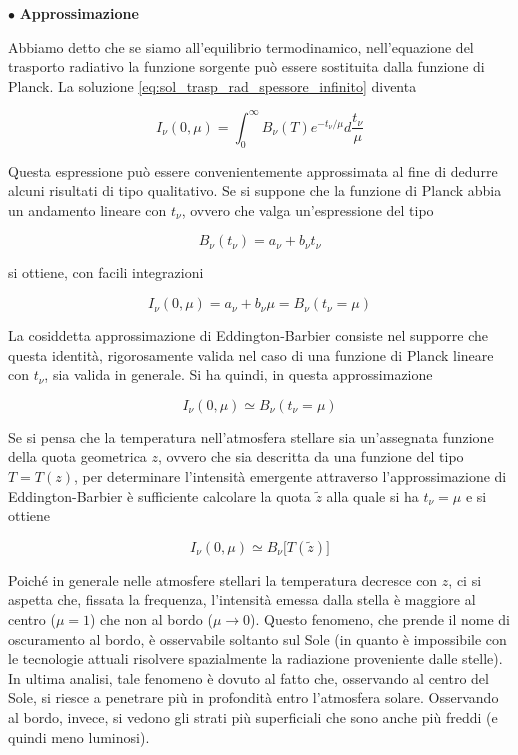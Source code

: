$\bullet$ \textbf{Approssimazione}

\vspace{0.2cm}Abbiamo detto che se siamo all'equilibrio termodinamico, nell'equazione del trasporto radiativo la funzione sorgente può essere sostituita dalla funzione di Planck. La soluzione \eqref{eq:sol_trasp_rad_spessore_infinito} diventa

\begin{equation}
    I_{\nu}(0,\mu)= \int_{0}^{\infty} B_{\nu}(T) e^{-t_{\nu}/\mu} d\frac{t_{\nu}}{\mu}
\end{equation}

Questa espressione può essere convenientemente approssimata al fine di dedurre alcuni risultati di tipo qualitativo. Se si suppone che la funzione di Planck abbia un andamento lineare con $t_{\nu}$, ovvero che valga un'espressione del tipo

$$B_{\nu}(t_{\nu})=a_{\nu} + b_{\nu}t_{\nu}$$

si ottiene, con facili integrazioni

$$I_{\nu}(0,\mu)=a_{\nu} + b_{\nu}\mu=B_{\nu}(t_{\nu}=\mu)$$

La cosiddetta approssimazione di Eddington-Barbier consiste nel supporre che questa identità, rigorosamente valida nel caso di una funzione di Planck lineare con $t_{\nu}$, sia valida in generale. Si ha quindi, in questa approssimazione

$$I_{\nu}(0,\mu) \simeq B_{\nu}(t_{\nu}=\mu)$$

Se si pensa che la temperatura nell'atmosfera stellare sia un'assegnata funzione della quota geometrica $z$, ovvero che sia descritta da una funzione del tipo $T=T(z)$, per determinare l'intensità emergente attraverso l'approssimazione di Eddington-Barbier è sufficiente calcolare la quota $\tilde{z}$ alla quale si ha $t_\nu=\mu$ e si ottiene

$$I_{\nu}(0,\mu) \simeq B_{\nu}\big[ T(\tilde{z}) \big]$$

Poiché in generale nelle atmosfere stellari la temperatura decresce con $z$, ci si aspetta che, fissata la frequenza, l'intensità emessa dalla stella è maggiore al centro ($\mu=1$) che non al bordo ($\mu \to 0$). Questo fenomeno, che prende il nome di oscuramento al bordo, è osservabile soltanto sul Sole (in quanto è impossibile con le tecnologie attuali risolvere spazialmente la radiazione proveniente dalle stelle). In ultima analisi, tale fenomeno è dovuto al fatto che, osservando al centro del Sole, si riesce a penetrare più in profondità entro l'atmosfera solare. Osservando al bordo, invece, si vedono gli strati più superficiali che sono anche più freddi (e quindi meno luminosi).

